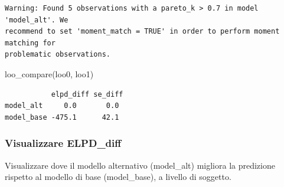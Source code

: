 \documentclass[
  11pt,
  a4paper,
  onecolumn]{article}
\newenvironment{Shaded}{}{}
\newcommand{\CommentTok}[1]{\textcolor[rgb]{0.42,0.45,0.49}{#1}}
\newcommand{\FunctionTok}[1]{\textcolor[rgb]{0.44,0.26,0.76}{#1}}
\newcommand{\NormalTok}[1]{\textcolor[rgb]{0.14,0.16,0.18}{#1}}
\newcommand{\OtherTok}[1]{\textcolor[rgb]{0.44,0.26,0.76}{#1}}
\newcommand{\SpecialCharTok}[1]{\textcolor[rgb]{0.00,0.36,0.77}{#1}}
\newcommand{\StringTok}[1]{\textcolor[rgb]{0.01,0.18,0.38}{#1}}
\begin{document}
\begin{verbatim}
Warning: Found 5 observations with a pareto_k > 0.7 in model 'model_alt'. We
recommend to set 'moment_match = TRUE' in order to perform moment matching for
problematic observations.
\end{verbatim}

\begin{Shaded}
\begin{Highlighting}[]
\FunctionTok{loo\_compare}\NormalTok{(loo0, loo1)}
\end{Highlighting}
\end{Shaded}

\begin{verbatim}
           elpd_diff se_diff
model_alt     0.0       0.0 
model_base -475.1      42.1 
\end{verbatim}

\subsubsection{Visualizzare ELPD\_diff}\label{visualizzare-elpd_diff}

Visualizzare dove il modello alternativo (model\_alt) migliora la
predizione rispetto al modello di base (model\_base), a livello di
soggetto.

\begin{Shaded}
\end{Shaded}

\begin{Shaded}
\end{Shaded}
\end{document}

